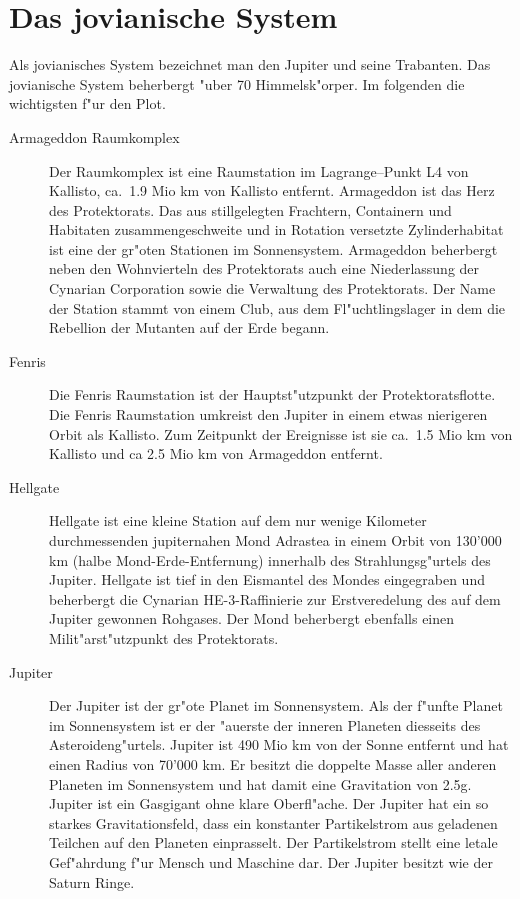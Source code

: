 \section{Das jovianische System}

Als jovianisches System bezeichnet man den Jupiter und seine Trabanten. Das jovianische System beherbergt "uber 70  Himmelsk"orper. Im folgenden die wichtigsten f"ur den Plot.

\begin{description}
\item [Armageddon Raumkomplex] Der Raumkomplex ist eine Raumstation im Lagrange--Punkt L4 von Kallisto, ca.~1.9 Mio km         von Kallisto entfernt. Armageddon ist das Herz des Protektorats. Das aus stillgelegten Frachtern, Containern und
      Habitaten zusammengeschwei\3te und in Rotation versetzte Zylinderhabitat ist eine der gr"o\3ten Stationen im Sonnensystem. Armageddon beherbergt neben den Wohnvierteln des Protektorats auch eine Niederlassung der Cynarian Corporation sowie die Verwaltung des Protektorats. Der Name der Station stammt von einem Club, aus dem Fl"uchtlingslager in dem die Rebellion der Mutanten auf der Erde begann.
\item [Fenris] Die Fenris Raumstation ist der Hauptst"utzpunkt der Protektoratsflotte. Die Fenris Raumstation umkreist
      den Jupiter in einem etwas nierigeren Orbit als Kallisto. Zum Zeitpunkt der Ereignisse ist sie ca.~1.5 Mio km von Kallisto und ca 2.5 Mio km von Armageddon entfernt.
\item [Hellgate] Hellgate ist eine kleine Station auf dem nur wenige Kilometer durchmessenden jupiternahen Mond
      Adrastea in einem Orbit von 130'000 km (halbe Mond-Erde-Entfernung) innerhalb des Strahlungsg"urtels des Jupiter. Hellgate ist tief in den Eismantel des Mondes eingegraben und beherbergt die Cynarian HE-3-Raffinierie zur Erstveredelung des auf dem Jupiter gewonnen Rohgases. Der Mond beherbergt ebenfalls einen Milit"arst"utzpunkt des Protektorats.
\item [Jupiter] Der Jupiter ist der gr"o\3te Planet im Sonnensystem. Als der f"unfte Planet im Sonnensystem ist er der
      "au\3erste der inneren Planeten diesseits des Asteroideng"urtels. Jupiter ist 490 Mio km von der Sonne entfernt und hat einen Radius von 70'000 km. Er besitzt die doppelte Masse aller anderen Planeten im Sonnensystem und hat damit eine Gravitation von 2.5g. Jupiter ist ein Gasgigant ohne klare Oberfl"ache. Der Jupiter hat ein so starkes Gravitationsfeld, dass ein konstanter Partikelstrom aus geladenen Teilchen auf den Planeten einprasselt. Der Partikelstrom stellt eine letale Gef"ahrdung f"ur Mensch und Maschine dar. Der Jupiter besitzt wie der Saturn Ringe.

\end{description}
